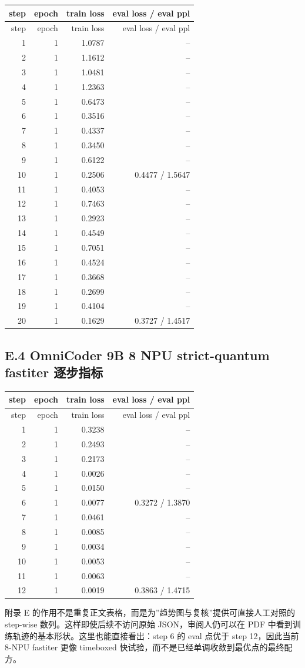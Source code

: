 \documentclass[11pt,a4paper]{article}
\begin{document}
\small
\begin{longtable}{r r r r}
\toprule
step & epoch & train loss & eval loss / eval ppl \\
\midrule
\endfirsthead
\toprule
step & epoch & train loss & eval loss / eval ppl \\
\midrule
\endhead
1 & 1 & 1.0787 & -- \\
2 & 1 & 1.1612 & -- \\
3 & 1 & 1.0481 & -- \\
4 & 1 & 1.2363 & -- \\
5 & 1 & 0.6473 & -- \\
6 & 1 & 0.3516 & -- \\
7 & 1 & 0.4337 & -- \\
8 & 1 & 0.3450 & -- \\
9 & 1 & 0.6122 & -- \\
10 & 1 & 0.2506 & 0.4477 / 1.5647 \\
11 & 1 & 0.4053 & -- \\
12 & 1 & 0.7463 & -- \\
13 & 1 & 0.2923 & -- \\
14 & 1 & 0.4549 & -- \\
15 & 1 & 0.7051 & -- \\
16 & 1 & 0.4524 & -- \\
17 & 1 & 0.3668 & -- \\
18 & 1 & 0.2699 & -- \\
19 & 1 & 0.4104 & -- \\
20 & 1 & 0.1629 & 0.3727 / 1.4517 \\
\bottomrule
\end{longtable}
\normalsize

\subsection{E.4 OmniCoder 9B 8 NPU strict-quantum fastiter 逐步指标}

\small
\begin{longtable}{r r r r}
\toprule
step & epoch & train loss & eval loss / eval ppl \\
\midrule
\endfirsthead
\toprule
step & epoch & train loss & eval loss / eval ppl \\
\midrule
\endhead
1 & 1 & 0.3238 & -- \\
2 & 1 & 0.2493 & -- \\
3 & 1 & 0.2173 & -- \\
4 & 1 & 0.0026 & -- \\
5 & 1 & 0.0150 & -- \\
6 & 1 & 0.0077 & 0.3272 / 1.3870 \\
7 & 1 & 0.0461 & -- \\
8 & 1 & 0.0085 & -- \\
9 & 1 & 0.0034 & -- \\
10 & 1 & 0.0053 & -- \\
11 & 1 & 0.0063 & -- \\
12 & 1 & 0.0019 & 0.3863 / 1.4715 \\
\bottomrule
\end{longtable}
\normalsize

附录 E 的作用不是重复正文表格，而是为”趋势图与复核”提供可直接人工对照的 step-wise 数列。这样即使后续不访问原始 JSON，审阅人仍可以在 PDF 中看到训练轨迹的基本形状。这里也能直接看出：step 6 的 eval 点优于 step 12，因此当前 8-NPU fastiter 更像 timeboxed 快试验，而不是已经单调收敛到最优点的最终配方。
\end{document}
